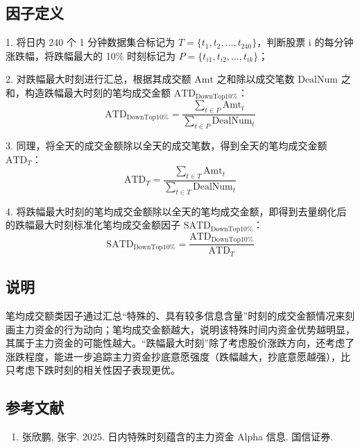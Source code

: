 \documentclass{article}
\begin{document}
\subsection{因子定义}

1. 将日内 240 个 1 分钟数据集合标记为 \( T = \{t_1, t_2, \dots, t_{240}\} \)，判断股票 i 的每分钟涨跌幅，将跌幅最大的 10\% 时刻标记为 \( P = \{t_{i1}, t_{i2}, \dots, t_{ik}\} \)；

2. 对跌幅最大时刻进行汇总，根据其成交额 \( \mathrm{Amt} \) 之和除以成交笔数 \( \mathrm{DealNum} \) 之和，构造跌幅最大时刻的笔均成交金额 \( \mathrm{ATD}_{\mathrm{DownTop10\%}} \)：
\begin{equation}
    \mathrm{ATD}_{\mathrm{DownTop10\%}} = \frac{\sum_{t \in P} \mathrm{Amt}_t}{\sum_{t \in P} \mathrm{DealNum}_t}
\end{equation}

3. 同理，将全天的成交金额除以全天的成交笔数，得到全天的笔均成交金额 \( \mathrm{ATD}_T \)：
\begin{equation}
    \mathrm{ATD}_T = \frac{\sum_{t \in T} \mathrm{Amt}_t}{\sum_{t \in T} \mathrm{DealNum}_t}
\end{equation}

4. 将跌幅最大时刻的笔均成交金额除以全天的笔均成交金额，即得到去量纲化后的跌幅最大时刻标准化笔均成交金额因子 \( \mathrm{SATD}_{\mathrm{DownTop10\%}} \)：
\begin{equation}
    \mathrm{SATD}_{\mathrm{DownTop10\%}} = \frac{\mathrm{ATD}_{\mathrm{DownTop10\%}}}{\mathrm{ATD}_T}
\end{equation}

\subsection{说明}
笔均成交额类因子通过汇总“特殊的、具有较多信息含量”时刻的成交金额情况来刻画主力资金的行为动向；笔均成交金额越大，说明该特殊时间内资金优势越明显，其属于主力资金的可能性越大。“跌幅最大时刻”除了考虑股价涨跌方向，还考虑了涨跌程度，能进一步追踪主力资金抄底意愿强度（跌幅越大，抄底意愿越强），比只考虑下跌时刻的相关性因子表现更优。

\subsection{参考文献}
\begin{enumerate}
    \item 张欣鹏, 张宇. 2025. 日内特殊时刻蕴含的主力资金 Alpha 信息. 国信证券.
\end{enumerate}
\end{document}
